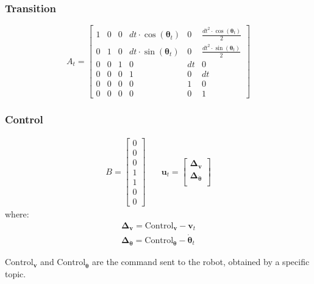 \subsubsection{Transition}
\begin{equation}
A_t
=
\begin{bmatrix} 
1 & 0 & 0 & dt \cdot \cos(\boldsymbol \theta_t) & 0 & \frac{dt^2 \cdot \cos(\boldsymbol \theta_t)}{2} \\ 
0 & 1 & 0 & dt \cdot \sin(\boldsymbol \theta_t)& 0 & \frac{dt^2 \cdot \sin(\boldsymbol \theta_t)}{2} \\ 
0 & 0 & 1 & 0 & dt & 0 \\ 
0 & 0 & 0 & 1 & 0 & dt \\ 
0 & 0 & 0 & 0 & 1 & 0 \\ 
0 & 0 & 0 & 0 & 0 & 1 
\end{bmatrix}
\end{equation}


\subsubsection{Control}
\begin{align}
B
= 
    \begin{bmatrix} 
    0 \\
    0 \\
    0 \\
    1 \\
    1 \\
    0 \\
    0  
    \end{bmatrix}
& \quad
\mathbf{u}_t
= 
    \begin{bmatrix} 
    \boldsymbol \Delta_{\mathbf{v}}  \\
    \boldsymbol \Delta_{ \dot{\boldsymbol \theta}} \\[0.3em]
    \end{bmatrix}
\end{align}
where:
  \begin{align}
     \boldsymbol \Delta_{\mathbf{v}} = \text{Control}_{\mathbf{v}} - \mathbf{v}_t  \\
    \boldsymbol \Delta_{ \dot{\boldsymbol \theta}} = \text{Control}_{\dot{\boldsymbol \theta}} - \dot{\boldsymbol \theta}_t
  \end{align}
  
$ \text{Control}_{\mathbf{v}}$ and  $\text{Control}_{\mathbf{\dot{\boldsymbol \theta}}}$ are the command sent to the robot, obtained by a specific topic.

